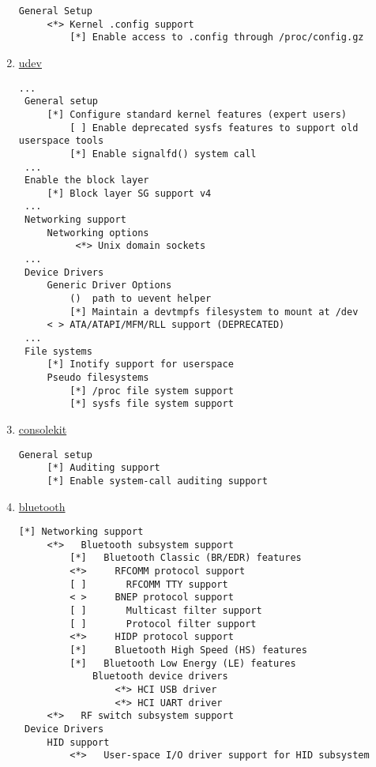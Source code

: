 \documentclass[11pt,a4paper]{article}
\begin{document}
\begin{enumerate}
                        \begin{lstlisting}[style=KernelConfig]
 General Setup
     <*> Kernel .config support
         [*] Enable access to .config through /proc/config.gz
                        \end{lstlisting}

                    \newpage
                    \item \href{https://wiki.gentoo.org/wiki/Udev#Kernel}{udev}

                        \begin{lstlisting}[style=KernelConfig]
 ...
 General setup
     [*] Configure standard kernel features (expert users)
         [ ] Enable deprecated sysfs features to support old userspace tools
         [*] Enable signalfd() system call
 ...
 Enable the block layer
     [*] Block layer SG support v4
 ...
 Networking support
     Networking options
          <*> Unix domain sockets
 ...
 Device Drivers
     Generic Driver Options
         ()  path to uevent helper
         [*] Maintain a devtmpfs filesystem to mount at /dev
     < > ATA/ATAPI/MFM/RLL support (DEPRECATED)
 ...
 File systems
     [*] Inotify support for userspace
     Pseudo filesystems
         [*] /proc file system support
         [*] sysfs file system support
                        \end{lstlisting}

                    \newpage
                    \item \href{https://wiki.gentoo.org/wiki/ConsoleKit#Kernel}{consolekit}
                        \begin{lstlisting}[style=KernelConfig]
 General setup
     [*] Auditing support
     [*] Enable system-call auditing support
                        \end{lstlisting}

                    \newpage
                    \item \href{https://wiki.gentoo.org/wiki/Bluetooth#Kernel}{bluetooth}

                        \begin{lstlisting}[style=KernelConfig]
 [*] Networking support
     <*>   Bluetooth subsystem support
         [*]   Bluetooth Classic (BR/EDR) features
         <*>     RFCOMM protocol support
         [ ]       RFCOMM TTY support
         < >     BNEP protocol support
         [ ]       Multicast filter support
         [ ]       Protocol filter support
         <*>     HIDP protocol support
         [*]     Bluetooth High Speed (HS) features
         [*]   Bluetooth Low Energy (LE) features
             Bluetooth device drivers
                 <*> HCI USB driver
                 <*> HCI UART driver
     <*>   RF switch subsystem support
 Device Drivers
     HID support
         <*>   User-space I/O driver support for HID subsystem
                        \end{lstlisting}


\end{enumerate}
\end{document}
